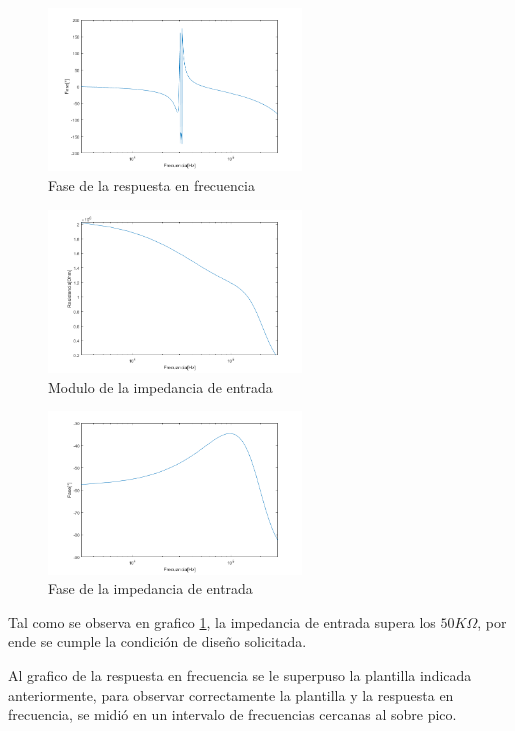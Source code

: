 \documentclass[../../tc_tp5_main.tex]{subfiles}
\begin{document}
\begin{figure}[H]	
	\centering
	\includegraphics[width=0.6\textwidth]{imagenes/fase.png}
	\caption{Fase de la respuesta en frecuencia}
\end{figure}

\begin{figure}[H]	
	\centering
	\includegraphics[width=0.6\textwidth]{imagenes/zinMag.png} 
	\caption{Modulo de la impedancia de entrada}\label{fig:zinmagg}
\end{figure}


\begin{figure}[H]	
	\centering
	\includegraphics[width=0.6\textwidth]{imagenes/zinFase.png}
	\caption{Fase de la impedancia de entrada}
\end{figure}
Tal como se observa en grafico \ref{fig:zinmagg}, la impedancia de entrada supera los $50K\Omega$, por ende se cumple la condición de diseño solicitada.

Al grafico de la respuesta en frecuencia se le superpuso la plantilla indicada anteriormente, para observar correctamente la plantilla y la respuesta en frecuencia, se midió en un intervalo de frecuencias cercanas al sobre pico.
\end{document}
